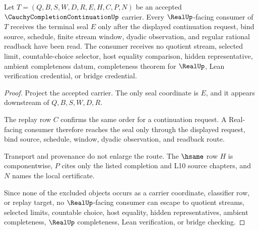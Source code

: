 \begin{theorem}
\label{thm:cauchy-completion-continuation-real-seal-nonescape}
Let $T=(Q,B,S,W,D,R,E,H,C,P,N)$ be an accepted $\CauchyCompletionContinuationUp$ carrier. Every $\RealUp$-facing consumer of $T$ receives the terminal seal $E$ only after the displayed continuation request, bind source, schedule, finite stream window, dyadic observation, and regular rational readback have been read. The consumer receives no quotient stream, selected limit, countable-choice selector, host equality comparison, hidden representative, ambient completeness datum, completeness theorem for $\RealUp$, Lean verification credential, or bridge credential.
\end{theorem}
\begin{proof}
Project the accepted carrier. The only seal coordinate is $E$, and it appears downstream of $Q,B,S,W,D,R$.

The replay row $C$ confirms the same order for a continuation request. A Real-facing consumer therefore reaches the seal only through the displayed request, bind source, schedule, window, dyadic observation, and readback route.

Transport and provenance do not enlarge the route. The $\hsame$ row $H$ is componentwise, $P$ cites only the listed completion and L10 source chapters, and $N$ names the local certificate.

Since none of the excluded objects occurs as a carrier coordinate, classifier row, or replay target, no $\RealUp$-facing consumer can escape to quotient streams, selected limits, countable choice, host equality, hidden representatives, ambient completeness, $\RealUp$ completeness, Lean verification, or bridge checking.
\end{proof}


